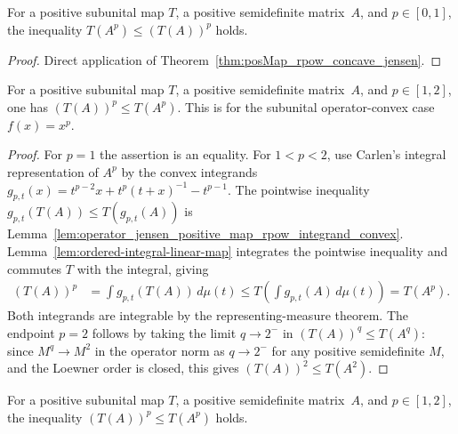 \begin{theorem}\label{thm:rpow_concave_jensen}
    \leanok
    For a positive subunital map $T$, a positive semidefinite matrix~$A$,
    and $p\in[0,1]$, the inequality $T(A^p)\le(T(A))^p$ holds.
\end{theorem}

\begin{proof}\leanok
    Direct application of Theorem~\ref{thm:posMap_rpow_concave_jensen}.
\end{proof}

\begin{theorem}\label{thm:posMap_rpow_convex_jensen}
    \leanok
    For a positive subunital map $T$, a positive semidefinite matrix~$A$,
    and $p\in[1,2]$, one has $(T(A))^p\le T(A^p)$.
    This is \cite[Theorem~5.11]{Wolf2012Quantum} for the subunital
    operator-convex case $f(x)=x^p$.
\end{theorem}

\begin{proof}\leanok
    For $p=1$ the assertion is an equality. For $1<p<2$, use Carlen's
    integral representation of $A^p$ by the convex integrands
    $g_{p,t}(x)=t^{p-2}x+t^p(t+x)^{-1}-t^{p-1}$. The pointwise inequality
    $g_{p,t}(T(A))\le T(g_{p,t}(A))$ is
    Lemma~\ref{lem:operator_jensen_positive_map_rpow_integrand_convex}.
    Lemma~\ref{lem:ordered-integral-linear-map} integrates the pointwise
    inequality and commutes $T$ with the integral, giving
    \begin{align}
        (T(A))^p&=\int g_{p,t}(T(A))\,d\mu(t)
        \leq T\!\left(\int g_{p,t}(A)\,d\mu(t)\right)=T(A^p).
        \label{eq:ch06_convex_power_integral_jensen}
    \end{align}
    Both integrands are integrable by the representing-measure theorem.
    The endpoint $p=2$ follows by taking the limit $q\to2^-$ in
    $(T(A))^q\le T(A^q)$: since $M^q\to M^2$ in the operator norm as
    $q\to2^-$ for any positive semidefinite $M$, and the Loewner order is
    closed, this gives $(T(A))^2\le T(A^2)$.
\end{proof}

\begin{theorem}\label{thm:rpow_convex_jensen}
    \leanok
    For a positive subunital map $T$, a positive semidefinite matrix~$A$,
    and $p\in[1,2]$, the inequality $(T(A))^p\le T(A^p)$ holds.
\end{theorem}

